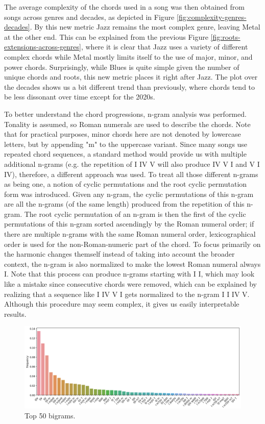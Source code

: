 \documentclass{article}
\begin{document}
The average complexity of the chords used in a song was then obtained from songs across genres and decades, as depicted in Figure \ref{fig:complexity-genres-decades}. By this new metric Jazz remains the most complex genre, leaving Metal at the other end. This can be explained from the previous Figure \ref{fig:roots-extensions-across-genres}, where it is clear that Jazz uses a variety of different complex chords while Metal mostly limits itself to the use of major, minor, and power chords. Surprisingly, while Blues is quite simple given the number of unique chords and roots, this new metric places it right after Jazz. The plot over the decades shows us a bit different trend than previously, where chords tend to be less dissonant over time except for the 2020s.

To better understand the chord progressions, n-gram analysis was performed. Tonality is assumed, so Roman numerals are used to describe the chords. Note that for practical purposes, minor chords here are not denoted by lowercase letters, but by appending "m" to the uppercase variant. Since many songs use repeated chord sequences, a standard method would provide us with multiple additional n-grams (e.g. the repetition of I IV V will also produce IV V I and V I IV), therefore, a different approach was used. To treat all those different n-grams as being one, a notion of cyclic permutations and the root cyclic permutation form was introduced. Given any n-gram, the cyclic permutations of this n-gram are all the n-grams (of the same length) produced from the repetition of this n-gram. The root cyclic permutation of an n-gram is then the first of the cyclic permutations of this n-gram sorted ascendingly by the Roman numeral order; if there are multiple n-grams with the same Roman numeral order, lexicographical order is used for the non-Roman-numeric part of the chord. To focus primarily on the harmonic changes themself instead of taking into account the broader context, the n-gram is also normalized to make the lowest Roman numeral always I. Note that this process can produce n-grams starting with I I, which may look like a mistake since consecutive chords were removed, which can be explained by realizing that a sequence like I IV V I gets normalized to the n-gram I I IV V. Although this procedure may seem complex, it gives us easily interpretable results.

\begin{figure}[!htbp]
    \centering
    \includegraphics[width=\linewidth]{images/bigram-plot.png}
    \caption{Top 50 bigrams.}
    \label{fig:bigram-plot}
\end{figure}
\end{document}
